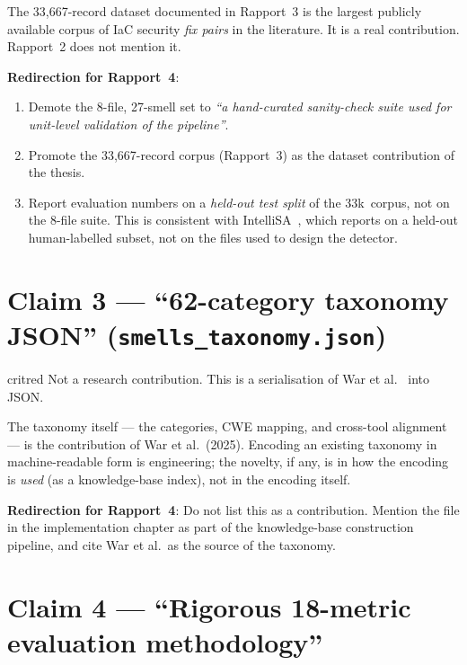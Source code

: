 \documentclass[11pt, a4paper]{report}
\begin{document}
\begin{findingbox}[Finding]
The 33{,}667-record dataset documented in Rapport~3 is the largest
publicly available corpus of IaC security \emph{fix pairs} in the
literature. It is a real contribution. Rapport~2 does not mention it.
\end{findingbox}

\textbf{Redirection for Rapport~4}:

\begin{enumerate}
  \item Demote the 8-file, 27-smell set to \emph{``a hand-curated
        sanity-check suite used for unit-level validation of the pipeline''}.
  \item Promote the 33{,}667-record corpus (Rapport~3) as the
        dataset contribution of the thesis.
  \item Report evaluation numbers on a \emph{held-out test split} of the
        33k~corpus, not on the 8-file suite. This is consistent with
        IntelliSA~\citep{intellisa2026}, which reports on a held-out
        human-labelled subset, not on the files used to design the detector.
\end{enumerate}

\section{Claim 3 --- ``62-category taxonomy JSON'' (\texttt{smells\_taxonomy.json})}

\begin{gradebox}{critred}
Not a research contribution. This is a serialisation of
War et al.~\citep{war2025taxonomy} into JSON.
\end{gradebox}

The taxonomy itself --- the categories, CWE mapping, and cross-tool
alignment --- is the contribution of War et al.\ (2025). Encoding an
existing taxonomy in machine-readable form is engineering; the novelty, if
any, is in how the encoding is \emph{used} (as a knowledge-base index), not
in the encoding itself.

\textbf{Redirection for Rapport~4}: Do not list this as a contribution.
Mention the file in the implementation chapter as part of the knowledge-base
construction pipeline, and cite War et al.\ as the source of the taxonomy.

\section{Claim 4 --- ``Rigorous 18-metric evaluation methodology''}
\end{document}
